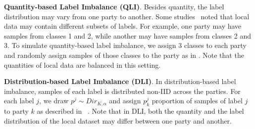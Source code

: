 \documentclass[conference]{IEEEtran}
\newcommand{\partitle}[1]{\smallskip \noindent \textbf{#1}.}
\begin{document}

\partitle{Quantity-based Label Imbalance (QLI)} Besides quantity, the label distribution may vary from one party to another. Some studies~\cite{FLMcMahan2016, DistImabalance2019} noted that local data may contain different subsets of labels. {For example, one party may have samples from classes 1 and 2, while another may have samples from classes 2 and 3. } To simulate quantity-based label imbalance, we assign 3 classes to each party and randomly assign samples of those classes to the party as in \cite{Silos2021}. Note that the quantities of local data are balanced in this setting. 

\partitle{Distribution-based Label Imbalance (DLI)} In distribution-based label imbalance, samples of each label is distributed non-IID across the parties. 
For each label $j$, we draw $p^j \sim Dir_{K,\alpha}$ and assign $p^j_k$ proportion of samples of label $j$ to party $k$ as described in ~\cite{Silos2021}. %
Note that in DLI, both the quantity and the label distribution of the local dataset may differ between one party and another.  
\end{document}
